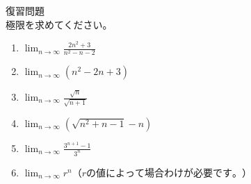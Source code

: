 \documentclass[12pt,a4paper]{jsarticle}
\begin{document}
復習問題\\
極限を求めてください。
\begin{enumerate}
    \item $\displaystyle \lim_{n\to\infty}\frac{2n^2+3}{n^2-n-2}$
    \item $\displaystyle \lim_{n\to\infty}(n^2-2n+3)$
    \item $\displaystyle \lim_{n\to\infty}\frac{\sqrt{n}}{\sqrt{n+1}}$
    \item $\displaystyle \lim_{n\to\infty}(\sqrt{n^2+n-1}-n)$
    \item $\displaystyle \lim_{n\to\infty}\frac{3^{n+1}-1}{3^n}$
    \item $\displaystyle \lim_{n\to\infty}r^n（rの値によって場合わけが必要です。）$
\end{enumerate}
\end{document}
